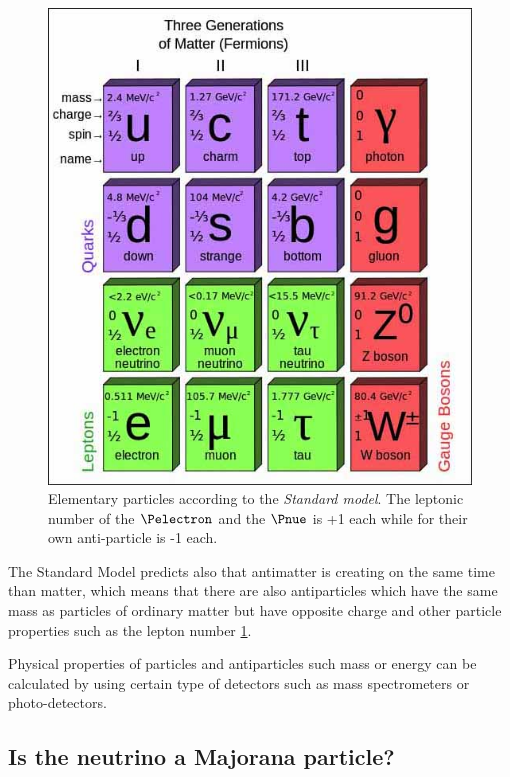 \documentclass[a4paper, 11pt]{report}%
\begin{document}
  \begin{figure}[!hbtp]
    \centering
    \includegraphics[trim=0cm 0cm 0cm 0cm, clip=true,totalheight=.5\textwidth]{../Pictures/StandardModelParticles.jpg}
    \caption{Elementary particles according to the \textit{Standard model}. The leptonic number of the $\Pelectron$ and the $\Pnue$ is +1 each while for their
    own anti-particle is -1 each.}
    \label{fig:elementary_particles}
  \end{figure}
  
  The Standard Model predicts also that antimatter is creating on the same time than matter, which means that  there are also 
  antiparticles which have the same mass as particles of ordinary matter but have opposite charge and other particle properties 
  such as the lepton number \ref{fig:elementary_particles}. 
    
  Physical properties of particles and antiparticles such mass or energy can be calculated by using certain type of 
  detectors such as mass spectrometers or photo-detectors.
  
  \subsection{Is the neutrino a Majorana particle?}
  
\end{document}
